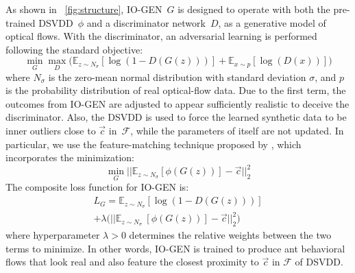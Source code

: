 \documentclass[letterpaper]{article} %
\let\orgautoref\autoref
\renewcommand{\autoref}
{\def\equationautorefname{Equation}%
	\def\figureautorefname{Fig.}%
	\def\subfigureautorefname{Fig.}%
	\def\Itemautorefname{item}%
	\def\tableautorefname{Table}%
	\def\exerciseautorefname{Exercise}%
	\def\starexerciseautorefname{Exercise}%
	\def\sectionautorefname{Section}%
	\def\subsectionautorefname{Section}%
	\def\subsubsectionautorefname{Section}%
	\def\chapterautorefname{Section}%
	\def\partautorefname{Part}%
	\orgautoref}
\begin{document}
As shown in~\autoref{fig:structure}, \mbox{IO-GEN}~$G$ is designed to operate
with both the pre-trained DSVDD~$\phi$ and a discriminator network~$D$,
as a generative model of optical flows. With the discriminator, an
adversarial learning is performed following the standard objective:
%
\begin{equation*}
    \label{eq:obj1}
    \min_{G} \max_{D}
    \Big( \mathbb{E}_{z \sim \mathit{N_{\sigma}}} [\log(1 - D(G(z)))]
    + \mathbb{E}_{x \sim p} [\log(D(x))] \Big)
\end{equation*}
%
where $\mathit{N_{\sigma}}$ is the zero-mean normal distribution with
standard deviation $\sigma$, and $p$ is the probability distribution of
real optical-flow data. Due to the first term, the outcomes from
\mbox{IO-GEN} are adjusted to appear sufficiently realistic to deceive the
discriminator. Also, the DSVDD is used to force the learned synthetic 
data to be inner outliers close to $\vec{c}$ in~$\mathcal{F}$, while the
parameters of itself are not updated. In particular, we use the
feature-matching technique proposed by \citet{SGZCRC16}, which
incorporates the minimization:
%
\begin{equation*}
	\label{eq:obj2}
	\min_{G}
	|| \mathbb{E}_{z \sim \mathit{N_{\sigma}}} [\phi(G(z))] 
	- \vec{c} ||^{2}_{2}
\end{equation*}
%
%
The composite loss function for \mbox{IO-GEN} is:
%
\begin{multline*}
\label{eq:loss}
	\mathit{L}_{G} = 
	\mathbb{E}_{z \sim \mathit{N_{\sigma}}} [\log(1 - D(G(z)))] \\
	+ \lambda \Big( || \mathbb{E}_{z \sim \mathit{N_{\sigma}}} \
	[\phi(G(z))] - \vec{c} ||^{2}_{2} \Big)
\end{multline*}
%
where hyperparameter $\lambda > 0$ determines the relative
weights between the two terms to minimize. In other words, \mbox{IO-GEN} is
trained to produce ant behavioral flows that look real and
also feature the closest proximity to $\vec{c}$ in $\mathcal{F}$ of
DSVDD.
\end{document}
